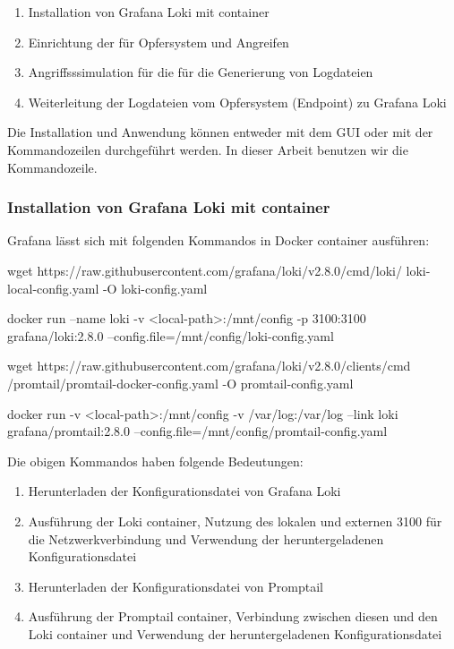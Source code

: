 \begin{enumerate}[noitemsep]
   \item Installation von Grafana Loki mit \gls{container}
   \item	Einrichtung der  für Opfersystem und Angreifen
   \item	Angriffsssimulation für die für die Generierung von Logdateien
   \item Weiterleitung der Logdateien vom Opfersystem (\gls{Endpoint}) zu Grafana Loki
\end{enumerate}

Die Installation und Anwendung können entweder mit dem \gls{GUI} oder mit der Kommandozeilen durchgeführt werden. In dieser Arbeit benutzen wir die Kommandozeile. 

\newpage
\subsubsection{Installation von Grafana Loki mit \gls{container}}
Grafana lässt sich mit folgenden Kommandos in Docker \gls{container} ausführen:

{
\begin{spverbatim}
wget https://raw.githubusercontent.com/grafana/loki/v2.8.0/cmd/loki/
loki-local-config.yaml -O loki-config.yaml

docker run --name loki -v <local-path>:/mnt/config -p 3100:3100 
grafana/loki:2.8.0 --config.file=/mnt/config/loki-config.yaml

wget https://raw.githubusercontent.com/grafana/loki/v2.8.0/clients/cmd
/promtail/promtail-docker-config.yaml -O promtail-config.yaml

docker run -v <local-path>:/mnt/config -v /var/log:/var/log --link loki 
grafana/promtail:2.8.0 --config.file=/mnt/config/promtail-config.yaml
\end{spverbatim}
}

Die obigen Kommandos haben folgende Bedeutungen:
\begin{enumerate}[noitemsep]
   \item Herunterladen der Konfigurationsdatei von Grafana Loki
   \item Ausführung der Loki \gls{container}, Nutzung des lokalen und externen  3100 für die Netzwerkverbindung und Verwendung der heruntergeladenen Konfigurationsdatei
   \item Herunterladen der Konfigurationsdatei von Promptail
   \item Ausführung der Promptail \gls{container}, Verbindung zwischen diesen und den Loki \gls{container} und Verwendung der heruntergeladenen Konfigurationsdatei
\end{enumerate}

